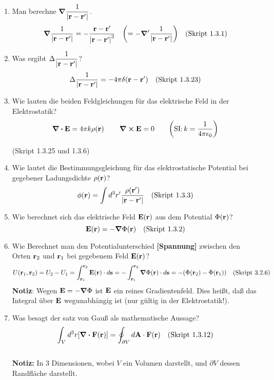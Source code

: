 \documentclass{scrartcl}
\newcommand{\rr}[1]{\frac{#1}{\abs{\vb{r}-\vb{r}'}}}
\newcommand{\ds}{\displaystyle}
\begin{document}
  \begin{enumerate}
    \item Man berechne $\ds \grad\rr{1}$.
          $$\ds \grad\rr{1}=
           -\frac{\vb r -\vb r'}{\abs{\vb r - \vb r'}^3}\quad
           \qty(=-\grad'\rr{1})\quad\text{(Skript 1.3.1)}$$ 

    \item Was ergibt $\ds \Delta\rr{1}$?
          $$\ds \Delta \rr{1} = -4\pi \delta(\vb r-\vb r')
          \quad\text{(Skript 1.3.23)}$$
      
    \item Wie lauten die beiden Feldgleichungen für das 
          elektrische Feld in der Elektrostatik?
          $$\ds \div \vb E=4\pi k\rho(\vb r)\,\qquad\curl\vb E=0
           \qquad\qty(\text{SI:}\,k=\frac{1}{4\pi\epsilon_0})$$
          \begin{center}
            (Skript 1.3.25 und 1.3.6)
          \end{center}
    
    \item Wie lautet die Bestimmungsgleichung für das elektrostatische 
          Potential bei gegebener Ladungsdichte $\rho(\vb r)$?
          $$\ds \phi(\vb r)=\int d^3r'\rr{\rho(\vb r')}
          \quad\text{(Skript 1.3.3)}$$

    \item Wie berechnet sich das elektrische Feld $\vb E (\vb r)$ aus dem
          Potential $\Phi(\vb r)$?
          $$\ds \vb E(\vb r) = - \grad \Phi (\vb r)
          \quad\text{(Skript 1.3.2)}$$

    \item Wie Berechnet man den Potentialunterschied \textbf{[Spannung]}
          zwischen den Orten 
          $\vb r_2$ und $\vb r_1$ bei gegebenem Feld $\vb E(\vb r)$?
          $$\ds U(\vb r_1, \vb r_2)=U_2-U_1
           =\int_{\vb r_1}^{\vb r_2} \vb E(\vb r)\cdot d\vb s
           =-\int_{\vb r_1}^{\vb r_2} \vb \grad \Phi (\vb r)\cdot d\vb s
           =-\qty(\Phi(\vb r_2)-\Phi(\vb r_1))
           \quad\text{(Skript 3.2.6)}$$
          \textbf{Notiz}: Wegen $\vb E=-\grad\Phi$ ist $\vb E$ ein reines
          Gradientenfeld. Dies heißt, daß das Integral über $\vb E$
          wegunabhängig ist (nur gültig in der Elektrostatik!).

    \item Was besagt der satz von Gauß als mathematische Aussage?
          $$\ds \int_V d^3r \qty[\div \vb F(\vb r)]=
           \oint_{\partial V}d\vb A\cdot \vb F(\vb r)
           \quad\text{(Skript 1.3.12)}$$\\
          \textbf{Notiz:} In 3 Dimensionen, wobei $V$ ein Volumen darstellt,
          und $\partial V$ dessen Randfläche darstellt.


\end{enumerate}
\end{document}
